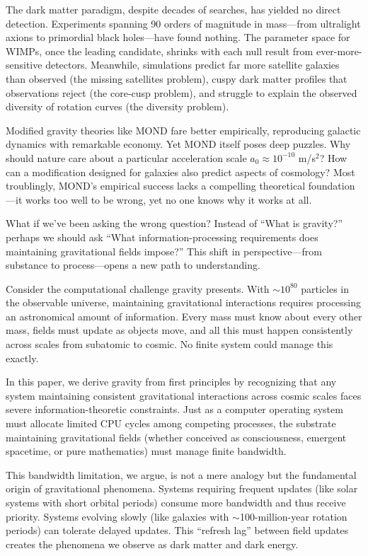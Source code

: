 \documentclass[twocolumn,prd,amsmath,amssymb,aps,superscriptaddress,nofootinbib]{revtex4-2}
\begin{document}
The dark matter paradigm, despite decades of searches, has yielded no direct detection. Experiments spanning 90 orders of magnitude in mass---from ultralight axions to primordial black holes---have found nothing. The parameter space for WIMPs, once the leading candidate, shrinks with each null result from ever-more-sensitive detectors. Meanwhile, simulations predict far more satellite galaxies than observed (the missing satellites problem), cuspy dark matter profiles that observations reject (the core-cusp problem), and struggle to explain the observed diversity of rotation curves (the diversity problem).

Modified gravity theories like MOND \cite{Milgrom1983} fare better empirically, reproducing galactic dynamics with remarkable economy. Yet MOND itself poses deep puzzles. Why should nature care about a particular acceleration scale $a_0 \approx 10^{-10}$ m/s$^2$? How can a modification designed for galaxies also predict aspects of cosmology? Most troublingly, MOND's empirical success lacks a compelling theoretical foundation---it works too well to be wrong, yet no one knows why it works at all.

What if we've been asking the wrong question? Instead of ``What is gravity?'' perhaps we should ask ``What information-processing requirements does maintaining gravitational fields impose?'' This shift in perspective---from substance to process---opens a new path to understanding.

Consider the computational challenge gravity presents. With $\sim 10^{80}$ particles in the observable universe, maintaining gravitational interactions requires processing an astronomical amount of information. Every mass must know about every other mass, fields must update as objects move, and all this must happen consistently across scales from subatomic to cosmic. No finite system could manage this exactly.

In this paper, we derive gravity from first principles by recognizing that any system maintaining consistent gravitational interactions across cosmic scales faces severe information-theoretic constraints. Just as a computer operating system must allocate limited CPU cycles among competing processes, the substrate maintaining gravitational fields (whether conceived as consciousness, emergent spacetime, or pure mathematics) must manage finite bandwidth.

This bandwidth limitation, we argue, is not a mere analogy but the fundamental origin of gravitational phenomena. Systems requiring frequent updates (like solar systems with short orbital periods) consume more bandwidth and thus receive priority. Systems evolving slowly (like galaxies with $\sim$100-million-year rotation periods) can tolerate delayed updates. This ``refresh lag'' between field updates creates the phenomena we observe as dark matter and dark energy.
\end{document}
